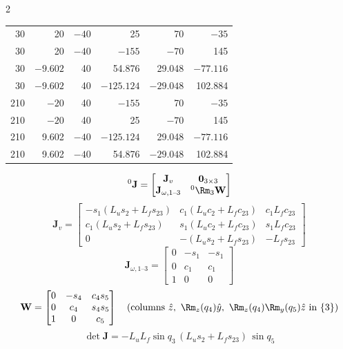 \begin{multicols}{2}
\begin{fbx}
{{\begin{tabular}{@{}rrrrrr@{}}
30&20&$-40$&25&70&$-35$\\30&20&$-40$&$-155$&$-70$&145\\30&$-9.602$&40&54.876&29.048&$-77.116$\\30&$-9.602$&40&$-125.124$&$-29.048$&102.884\\
210&$-20$&40&$-155$&70&$-35$\\210&$-20$&40&25&$-70$&145\\210&9.602&$-40$&$-125.124$&29.048&$-77.116$\\210&9.602&$-40$&54.876&$-29.048$&102.884
\end{tabular}} \chk}
\end{fbx}
\begin{fbx}
\[{}^0\mathbf J=\begin{bmatrix}\mathbf J_{v}&\mathbf 0_{3\times3}\\\mathbf J_{\omega,1\text{--}3}&{}^0\Rm_3\mathbf W\end{bmatrix}\]
\[\mathbf J_v=\begin{bmatrix}-s_1(L_us_2+L_fs_{23})&c_1(L_uc_2+L_fc_{23})&c_1L_fc_{23}\\c_1(L_us_2+L_fs_{23})&s_1(L_uc_2+L_fc_{23})&s_1L_fc_{23}\\0&-(L_us_2+L_fs_{23})&-L_fs_{23}\end{bmatrix}\]
\[\mathbf J_{\omega,1\text{--}3}=\begin{bmatrix}0&-s_1&-s_1\\0&c_1&c_1\\1&0&0\end{bmatrix}\]
\[\mathbf W=\begin{bmatrix}0&-s_4&c_4s_5\\0&c_4&s_4s_5\\1&0&c_5\end{bmatrix}\quad(\text{columns }\hat z,\ \Rm_z(q_4)\hat y,\ \Rm_z(q_4)\Rm_y(q_5)\hat z\text{ in }\{3\})\]
\[\det\mathbf J=-L_uL_f\sin q_3\,(L_us_2+L_fs_{23})\,\sin q_5\]

\end{fbx}
\end{multicols}
